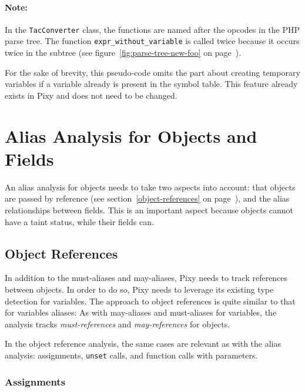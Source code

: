 \paragraph{Note:} In the \texttt{TacConverter} class, the functions are named after the opcodes in the PHP parse tree. The function \texttt{expr\_without\_variable} is called twice because it occurs twice in the subtree (see figure~\ref{fig:parse-tree-new-foo} on page~\pageref{fig:parse-tree-new-foo}).

For the sake of brevity, this pseudo-code omits the part about creating temporary variables if a variable already is present in the symbol table. This feature already exists in Pixy and does not need to be changed.


\section{Alias Analysis for Objects and Fields}

An alias analysis for objects needs to take two aspects into account: that objects are passed by reference (see section~\ref{object-references} on page~\pageref{object-references}), and the alias relationships between fields. This is an important aspect because objects cannot have a taint status, while their fields can.


\subsection{Object References}

In addition to the must-aliases and may-aliases, Pixy needs to track references between objects. In order to do so, Pixy needs to leverage its existing type detection for variables. The approach to object references is quite similar to that for variables aliases: As with may-aliases and must-aliases for variables, the analysis tracks \emph{must-references} and \emph{may-references} for objects.

In the object reference analysis, the same cases are relevant as with the alias analysis: assignments, \texttt{unset} calls, and function calls with parameters.


\subsubsection{Assignments}

